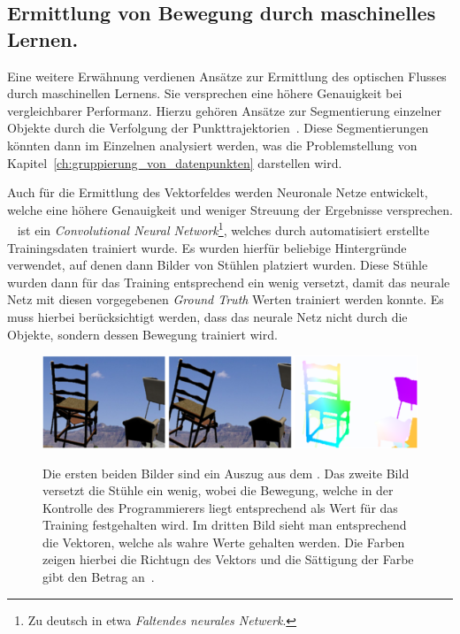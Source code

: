 \subsection{Ermittlung von Bewegung durch maschinelles Lernen.}

Eine weitere Erwähnung verdienen Ansätze zur Ermittlung des optischen Flusses durch maschinellen Lernens.
Sie versprechen eine höhere Genauigkeit bei vergleichbarer Performanz.
Hierzu gehören Ansätze zur Segmentierung einzelner Objekte durch die Verfolgung der Punkttrajektorien~\cite{Ochs2014, Keuper2015}.
Diese Segmentierungen könnten dann im Einzelnen analysiert werden, was die Problemstellung von Kapitel~\ref{ch:gruppierung_von_datenpunkten} darstellen wird.

Auch für die Ermittlung des Vektorfeldes werden Neuronale Netze entwickelt, welche eine höhere Genauigkeit und weniger Streuung der Ergebnisse versprechen.
~\cite{Fischer2015} ist ein \textit{Convolutional Neural Network}\footnote{Zu deutsch in etwa \textit{Faltendes neurales Netwerk}.}, welches durch automatisiert erstellte Trainingsdaten trainiert wurde.
Es wurden hierfür beliebige Hintergründe verwendet, auf denen dann Bilder von Stühlen platziert wurden.
Diese Stühle wurden dann für das Training entsprechend ein wenig versetzt, damit das neurale Netz mit diesen vorgegebenen \textit{Ground Truth} Werten trainiert werden konnte.
Es muss hierbei berücksichtigt werden, dass das neurale Netz nicht durch die Objekte, sondern dessen Bewegung trainiert wird.

\begin{figure}
    \centering
    \includegraphics[width=\textwidth]{gfx/flownet_flying_chairs.png}
    \label{fig:flownet_flying_chairs}
    \caption[Beispiele aus dem ]{Die ersten beiden Bilder sind ein Auszug aus dem . Das zweite Bild versetzt die Stühle ein wenig, wobei die Bewegung, welche in der Kontrolle des Programmierers liegt entsprechend als Wert für das Training festgehalten wird. Im dritten Bild sieht man entsprechend die Vektoren, welche als wahre Werte gehalten werden. Die Farben zeigen hierbei die Richtugn des Vektors und die Sättigung der Farbe gibt den Betrag an~\cite{Fischer2015}.}
\end{figure}

